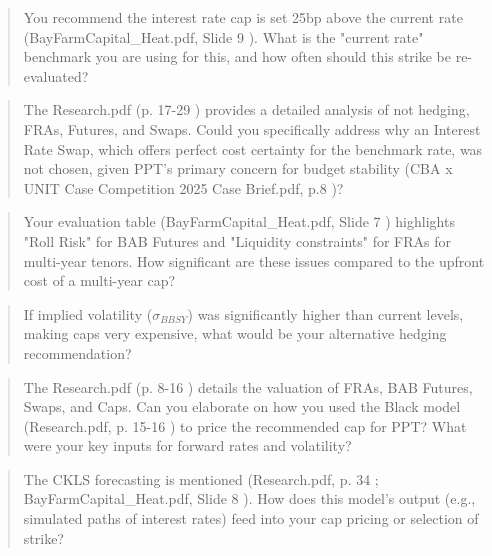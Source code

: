 \documentclass[11pt, a4paper, british]{article}
\begin{document}
\newpage

\begin{quote}
    You recommend the interest rate cap is set 25bp above the current rate (BayFarmCapital_Heat.pdf, Slide 9 ). What is the "current rate" benchmark you are using for this, and how often should this strike be re-evaluated?
\end{quote}

\newpage

\begin{quote}
    The Research.pdf (p. 17-29 ) provides a detailed analysis of not hedging, FRAs, Futures, and Swaps. Could you specifically address why an Interest Rate Swap, which offers perfect cost certainty for the benchmark rate, was not chosen, given PPT's primary concern for budget stability (CBA x UNIT Case Competition 2025 Case Brief.pdf, p.8 )?
\end{quote}

\newpage

\begin{quote}
    Your evaluation table (BayFarmCapital_Heat.pdf, Slide 7 ) highlights "Roll Risk" for BAB Futures and "Liquidity constraints" for FRAs for multi-year tenors. How significant are these issues compared to the upfront cost of a multi-year cap?
\end{quote}

\newpage

\begin{quote}
    If implied volatility ($\sigma_{BBSY}$) was significantly higher than current levels, making caps very expensive, what would be your alternative hedging recommendation?
\end{quote}

\newpage

\begin{quote}
    The Research.pdf (p. 8-16 ) details the valuation of FRAs, BAB Futures, Swaps, and Caps. Can you elaborate on how you used the Black model (Research.pdf, p. 15-16 ) to price the recommended cap for PPT? What were your key inputs for forward rates and volatility?
\end{quote}

\newpage

\begin{quote}
    The CKLS forecasting is mentioned (Research.pdf, p. 34 ; BayFarmCapital_Heat.pdf, Slide 8 ). How does this model's output (e.g., simulated paths of interest rates) feed into your cap pricing or selection of strike?
\end{quote}
\end{document}
